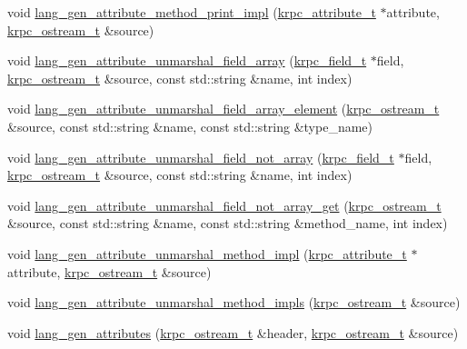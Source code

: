 \begin{DoxyCompactItemize}
\item 
void \hyperlink{classkrpc__gen__cpp__t_ac9a4b1ef368af13392fe30c52fe9db9d}{lang\+\_\+gen\+\_\+attribute\+\_\+method\+\_\+print\+\_\+impl} (\hyperlink{classkrpc__attribute__t}{krpc\+\_\+attribute\+\_\+t} $\ast$attribute, \hyperlink{classkrpc__ostream__t}{krpc\+\_\+ostream\+\_\+t} \&source)
\item 
void \hyperlink{classkrpc__gen__cpp__t_ab8cf488710c847cacac29f0b15246db6}{lang\+\_\+gen\+\_\+attribute\+\_\+unmarshal\+\_\+field\+\_\+array} (\hyperlink{classkrpc__field__t}{krpc\+\_\+field\+\_\+t} $\ast$field, \hyperlink{classkrpc__ostream__t}{krpc\+\_\+ostream\+\_\+t} \&source, const std\+::string \&name, int index)
\item 
void \hyperlink{classkrpc__gen__cpp__t_aa8633e0f12763fe7291541d3cad34fc0}{lang\+\_\+gen\+\_\+attribute\+\_\+unmarshal\+\_\+field\+\_\+array\+\_\+element} (\hyperlink{classkrpc__ostream__t}{krpc\+\_\+ostream\+\_\+t} \&source, const std\+::string \&name, const std\+::string \&type\+\_\+name)
\item 
void \hyperlink{classkrpc__gen__cpp__t_ad573848310b69cdcb9f2ef5e9506e208}{lang\+\_\+gen\+\_\+attribute\+\_\+unmarshal\+\_\+field\+\_\+not\+\_\+array} (\hyperlink{classkrpc__field__t}{krpc\+\_\+field\+\_\+t} $\ast$field, \hyperlink{classkrpc__ostream__t}{krpc\+\_\+ostream\+\_\+t} \&source, const std\+::string \&name, int index)
\item 
void \hyperlink{classkrpc__gen__cpp__t_afe95d55c570ba98cb4ca7ee94dc674eb}{lang\+\_\+gen\+\_\+attribute\+\_\+unmarshal\+\_\+field\+\_\+not\+\_\+array\+\_\+get} (\hyperlink{classkrpc__ostream__t}{krpc\+\_\+ostream\+\_\+t} \&source, const std\+::string \&name, const std\+::string \&method\+\_\+name, int index)
\item 
void \hyperlink{classkrpc__gen__cpp__t_a5ed607a0699f7e8b11de6a98d19281e5}{lang\+\_\+gen\+\_\+attribute\+\_\+unmarshal\+\_\+method\+\_\+impl} (\hyperlink{classkrpc__attribute__t}{krpc\+\_\+attribute\+\_\+t} $\ast$attribute, \hyperlink{classkrpc__ostream__t}{krpc\+\_\+ostream\+\_\+t} \&source)
\item 
void \hyperlink{classkrpc__gen__cpp__t_a279b21f738c37d95fb2044b22a13ec84}{lang\+\_\+gen\+\_\+attribute\+\_\+unmarshal\+\_\+method\+\_\+impls} (\hyperlink{classkrpc__ostream__t}{krpc\+\_\+ostream\+\_\+t} \&source)
\item 
void \hyperlink{classkrpc__gen__cpp__t_aad8ec816eb4a877732d5371865bdf771}{lang\+\_\+gen\+\_\+attributes} (\hyperlink{classkrpc__ostream__t}{krpc\+\_\+ostream\+\_\+t} \&header, \hyperlink{classkrpc__ostream__t}{krpc\+\_\+ostream\+\_\+t} \&source)

\end{DoxyCompactItemize}
